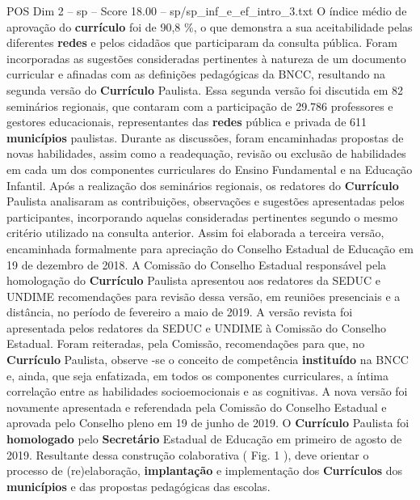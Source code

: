 \begin{textsample}{POS Dim 2 – sp – Score 18.00 – sp/sp\_inf\_e\_ef\_intro\_3.txt}
O índice médio de aprovação do \textbf{currículo} foi de 90,8 \%, o que demonstra a sua aceitabilidade pelas diferentes \textbf{redes} e pelos cidadãos que participaram da consulta pública.
Foram incorporadas as sugestões consideradas pertinentes à natureza de um documento curricular e afinadas com as definições pedagógicas da BNCC, resultando na segunda versão do \textbf{Currículo} Paulista.
Essa segunda versão foi discutida em 82 seminários regionais, que contaram com a participação de 29.786 professores e gestores educacionais, representantes das \textbf{redes} pública e privada de 611 \textbf{municípios} paulistas.
Durante as discussões, foram encaminhadas propostas de novas habilidades, assim como a readequação, revisão ou exclusão de habilidades em cada um dos componentes curriculares do Ensino Fundamental e na Educação Infantil.
Após a realização dos seminários regionais, os redatores do \textbf{Currículo} Paulista analisaram as contribuições, observações e sugestões apresentadas pelos participantes, incorporando aquelas consideradas pertinentes segundo o mesmo critério utilizado na consulta anterior.
Assim foi elaborada a terceira versão, encaminhada formalmente para apreciação do Conselho Estadual de Educação em 19 de dezembro de 2018.
A Comissão do Conselho Estadual responsável pela homologação do \textbf{Currículo} Paulista apresentou aos redatores da SEDUC e UNDIME recomendações para revisão dessa versão, em reuniões presenciais e a distância, no período de fevereiro a maio de 2019.
A versão revista foi apresentada pelos redatores da SEDUC e UNDIME à Comissão do Conselho Estadual.
Foram reiteradas, pela Comissão, recomendações para que, no \textbf{Currículo} Paulista, observe -se o conceito de competência \textbf{instituído} na BNCC e, ainda, que seja enfatizada, em todos os componentes curriculares, a íntima correlação entre as habilidades socioemocionais e as cognitivas.
A nova versão foi novamente apresentada e referendada pela Comissão do Conselho Estadual e aprovada pelo Conselho pleno em 19 de junho de 2019.
O \textbf{Currículo} Paulista foi \textbf{homologado} pelo \textbf{Secretário} Estadual de Educação em primeiro de agosto de 2019.
Resultante dessa construção colaborativa ( Fig. 1 ), deve orientar o processo de (re)elaboração, \textbf{implantação} e implementação dos \textbf{Currículos} dos \textbf{municípios} e das propostas pedagógicas das escolas.

\end{textsample}
